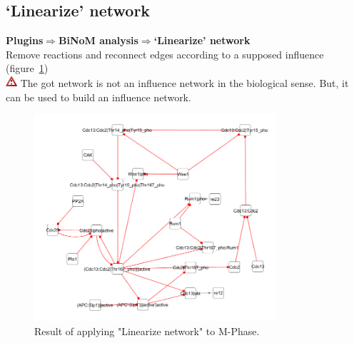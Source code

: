\subsection{‘Linearize’ network}
\textbf{Plugins$\Rightarrow$BiNoM analysis$\Rightarrow$‘Linearize’ network}\\
Remove reactions and reconnect edges according to a supposed influence (figure~\ref{Linearized_Network_M-Phase})\\
\includegraphics[width=12pt,height=12pt]{graphics/warning} The got network is not an influence network in the biological sense. But, it can be used to build an influence network.
\begin{figure}
\centering
\includegraphics[width=0.8\textwidth]{graphics/Linearized_Network_M-Phase}
\caption{Result of applying "Linearize network" to M-Phase.}
\label{Linearized_Network_M-Phase}
\end{figure}


